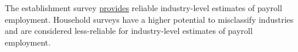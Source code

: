 \documentclass{report}
\newcommand{\tbllink}[1]{\href{https://raw.githubusercontent.com/bdecon/US-chartbook/master/chartbook/data/#1}{\faTable}}
\newcommand{\stdnode}[3]{\node[below, align=left, shift=({#1,#2})]{#3};}
\begin{document}
{\begin{minipage}{0.76\textwidth}
%	
%
%
%
%
\end{minipage}
\newpage
\begin{minipage}{0.76\textwidth} 
\small The establishment survey \href{https://www.bls.gov/news.release/empsit.t17.htm}{provides} reliable industry-level estimates of payroll employment. Household surveys have a higher potential to misclassify industries and are considered less-reliable for industry-level estimates of payroll employment.


\end{minipage}}
\end{document}

